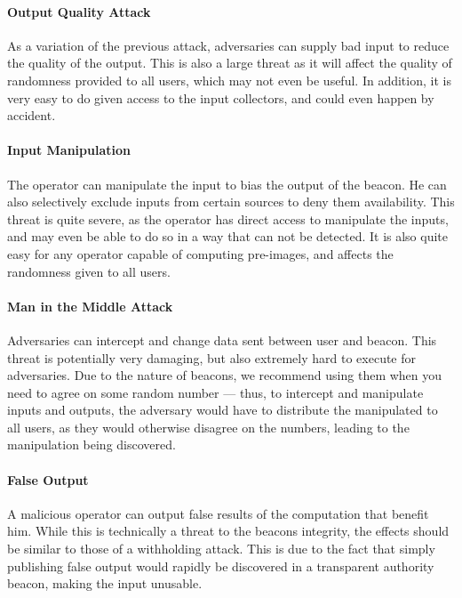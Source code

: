 \paragraph{Output Quality Attack} As a variation of the previous attack, adversaries can supply bad input to reduce the quality of the output. This is also a large threat as it will affect the quality of randomness provided to all users, which may not even be useful. In addition, it is very easy to do given access to the input collectors, and could even happen by accident.
\paragraph{Input Manipulation} The operator can manipulate the input to bias the output of the beacon. He can also selectively exclude inputs from certain sources to deny them availability. This threat is quite severe, as the operator has direct access to manipulate the inputs, and may even be able to do so in a way that can not be detected. It is also quite easy for any operator capable of computing pre-images, and affects the randomness given to all users.
\paragraph{Man in the Middle Attack} Adversaries can intercept and change data sent between user and beacon. This threat is potentially very damaging, but also extremely hard to execute for adversaries. Due to the nature of beacons, we recommend using them when you need to agree on some random number --- thus, to intercept and manipulate inputs and outputs, the adversary would have to distribute the manipulated to all users, as they would otherwise disagree on the numbers, leading to the manipulation being discovered.
\paragraph{False Output} A malicious operator can output false results of the computation that benefit him. While this is technically a threat to the beacons integrity, the effects should be similar to those of a withholding attack. This is due to the fact that simply publishing false output would rapidly be discovered in a transparent authority beacon, making the input unusable.
